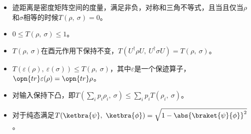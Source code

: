 \begin{itemize}
\item 迹距离是密度矩阵空间的度量，满足非负，对称和三角不等式，且当且仅当$\rho$和$\sigma$相等的时候$T\left(\rho,~\sigma\right) = 0$。
\item $0 \leqslant T\left(\rho,~\sigma\right) \leqslant 1$。
\item $T\left(\rho,~\sigma\right)$在酉元作用下保持不变，$T\left(U^\dagger\rho U,~U^\dagger\sigma U\right) = T\left(\rho,~\sigma\right)$。
\item $T\left(\varepsilon(\rho),~\varepsilon(\sigma)\right) \leqslant T\left(\rho,~\sigma\right)$，其中$\varepsilon$是一个保迹算子，$\opn{tr}\varepsilon(\rho) = \opn{tr}\rho$。
\item 对输入保持下凸，即$T\left(\sum_i p_i\rho_i,~\sigma\right) \leqslant \sum_i p_iT\left(\rho_i,~\sigma\right)$。
\item 对于纯态满足$T(\ketbra{\psi},~\ketbra{\phi}) = \sqrt{1 - \abs{\braket{\psi}{\phi}}^2}$。
\end{itemize}
